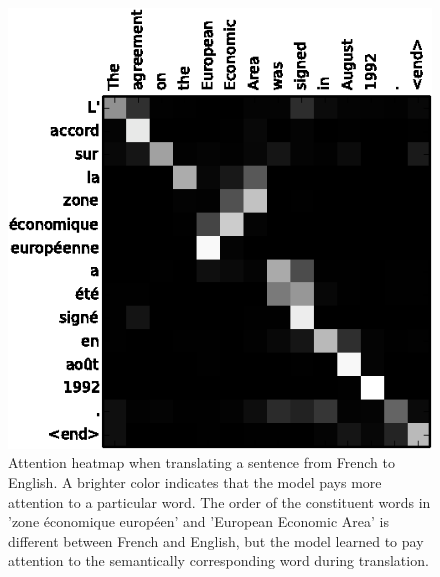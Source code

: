 \begin{figure}
	\centering\includegraphics[width=1\textwidth]{../visualizations/ch4-methods/attention_heatmap.png} 
	\caption{Attention heatmap when translating a sentence from French to English. A brighter color indicates that the model pays more attention to a particular word. The order of the constituent words in 'zone \'economique europ\'een' and 'European Economic Area' is different between French and English, but the model learned to pay attention to the semantically corresponding word during translation. }
	\label{fig:attention_heatmap}
\end{figure}



